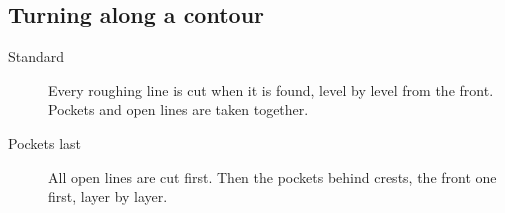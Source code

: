 
\subsection{Turning along a contour}
\begin{description}
\item[Standard] Every roughing line is cut when it is found, level by level from the front. Pockets and open lines are taken together.
\item[Pockets last] All open lines are cut first. Then the pockets behind crests, the front one first, layer by layer.
\end{description}

